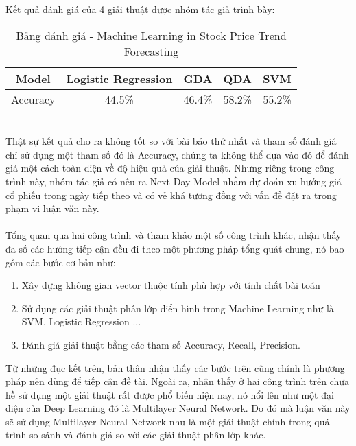 Kết quả đánh giá của 4 giải thuật được nhóm tác giả trình bày:
\begin{table}[h]
\centering
\begin{tabular}{ |c|c|c|c|c| }
\hline
Model & Logistic Regression & GDA & QDA & SVM \\
\hline
Accuracy & 44.5\% & 46.4\% & 58.2\% & 55.2\% \\
\hline
\end{tabular}
\caption{Bảng đánh giá - Machine Learning in Stock Price Trend Forecasting }
\end{table}\\
Thật sự kết quả cho ra không tốt so với bài báo thứ nhất và tham số đánh giá 
chỉ sử dụng một tham số đó là Accuracy, chúng ta không thể dựa vào đó để đánh giá 
một cách toàn diện về độ hiệu quả của giải thuật. Nhưng riêng trong công trình 
này, nhóm tác giả có nêu ra Next-Day Model nhằm dự đoán xu hướng giá cổ phiếu 
trong ngày tiếp theo và có vẻ khá tương đồng với vấn đề đặt ra trong phạm vi 
luận văn này.\\\\
Tổng quan qua hai công trình và tham khảo một số công trình khác, nhận thấy 
đa số các hướng tiếp cận đều đi theo một phương pháp tổng quát chung, nó bao gồm các bước 
cơ bản như:
\begin{enumerate}
\item Xây dựng không gian vector thuộc tính phù hợp với tính chất bài toán
\item Sử dụng các giải thuật phân lớp điển hình trong Machine Learning như là 
SVM, Logistic Regression ...
\item Đánh giá giải thuật bằng các tham số Accuracy, Recall, Precision.
\end{enumerate}
Từ những đục kết trên, bản thân nhận thấy các bước trên cũng chính là phương pháp 
nên dùng để tiếp cận đề tài. Ngoài ra, nhận thấy ở hai công trình trên chưa 
hề sử dụng một giải thuật rất được phổ biến hiện nay, nó nổi lên như một đại 
diện của Deep Learning đó là Multilayer Neural Network. Do đó mà luận văn này sẽ sử dụng 
Multilayer Neural Network như là một giải thuật chính trong quá trình so sánh 
và đánh giá so với các giải thuật phân lớp khác.
